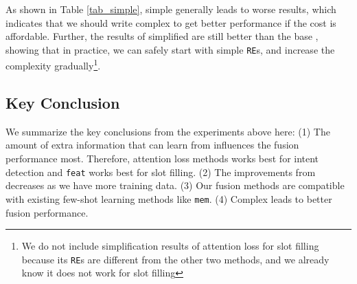 As shown in Table \ref{tab_simple}, simple \RE generally leads to worse results, which indicates that we should write complex \RE to get better performance if the cost is affordable.
Further, the results of simplified \RE are still better than the base \BLSTM, showing that in practice, we can safely start with simple \texttt{RE}s, and increase the complexity gradually\footnote{
We do not include simplification results of attention loss for slot filling because its \texttt{RE}s are different from the other two methods, and we already know it does not work for slot filling}.

\subsection{Key Conclusion}
We summarize the key conclusions from the experiments above here:
(1) The amount of extra information that \NN can learn from \RE influences the fusion performance most. Therefore, attention loss methods works best for intent detection and \texttt{feat} works best for slot filling.
(2) The improvements from \RE decreases as we have more training data.
(3) Our fusion methods are compatible with existing few-shot learning methods like \texttt{mem}.
(4) Complex \RE leads to better fusion performance.
